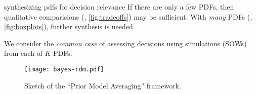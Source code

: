 \begin{block}{synthesizing pdfs for decision relevance}
    If there are only a few PDFs, then qualitative comparisions (\eg, \cref{fig:tradeoffs}) may be sufficient.
    With \emph{many} PDFs (\eg, \cref{fig:boxplots}), further synthesis is needed.

    We consider the \emph{common case} of assessing decisions using simulations (SOWs) from each of $K$ PDFs.
    \begin{figure}
        \centering
        \texttt{[image: bayes-rdm.pdf]}
        \caption{
            Sketch of the ``Prior Model Averaging'' framework.
        }\label{fig:flowchart}
    \end{figure}
\end{block}